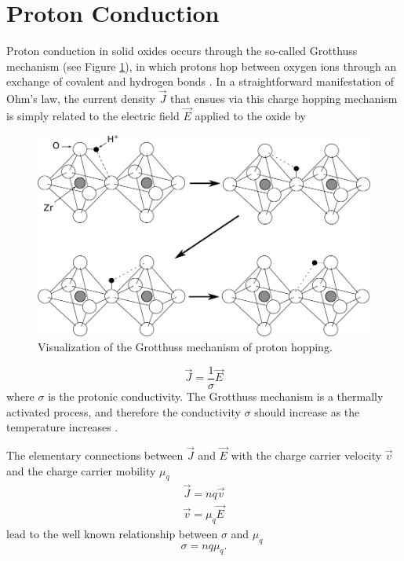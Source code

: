 \vspace{12pt}
\section{Proton Conduction}Proton conduction in solid oxides occurs through the so-called Grotthuss mechanism (see Figure \ref{back:fig:grotthuss}), in which protons hop between oxygen ions through an exchange of covalent and hydrogen bonds \cite{Nowick1995}. In a straightforward manifestation of Ohm's law, the current density $\vec{J}$ that ensues via this charge hopping mechanism is simply related to the electric field $\vec{E}$ applied to the oxide by
\begin{figure}[tb]
    \centering
    \includegraphics[width=\linewidth]{Figures/protonHopping.pdf}
    \caption{Visualization of the Grotthuss mechanism of proton hopping.}
    \label{back:fig:grotthuss}
\end{figure}
\begin{equation}
\vec{J}=\frac{1}{\sigma} \vec{E} 
\end{equation}
where $\sigma$ is the protonic conductivity. The Grotthuss mechanism is a thermally activated process, and therefore the conductivity $\sigma$ should increase as the temperature increases \cite{Babilo2007b}.

The elementary connections between $\vec{J}$ and $\vec{E}$ with the charge carrier velocity $\vec{v}$ and the charge carrier mobility $\mu_q$
\begin{subequations}
\begin{align}
\vec{J} = n q \vec{v} \\
\vec{v} = \mu_q \vec{E}
\end{align}
\end{subequations}
lead to the well known relationship between $\sigma$ and $\mu_q$
\begin{equation}
\sigma = n q \mu_q.
\label{eq:back:conductivity}
\end{equation}

